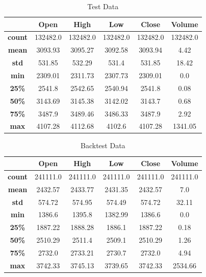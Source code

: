 \begin{table}[H]
    \centering
    \begin{tabular}{cccccc}
        \toprule
        & Open & High & Low & Close & Volume
        \\
        \midrule
        \textbf{count} & 132482.0 & 132482.0 & 132482.0 & 132482.0 & 132482.0 \\
        \textbf{mean}  & 3093.93  & 3095.27  & 3092.58  & 3093.94  & 4.42     \\
        \textbf{std}   & 531.85   & 532.29   & 531.4    & 531.85   & 18.42    \\
        \textbf{min}   & 2309.01  & 2311.73  & 2307.73  & 2309.01  & 0.0      \\
        \textbf{25\%}  & 2541.8   & 2542.65  & 2540.94  & 2541.8   & 0.08     \\
        \textbf{50\%}  & 3143.69  & 3145.38  & 3142.02  & 3143.7   & 0.68     \\
        \textbf{75\%}  & 3487.9   & 3489.46  & 3486.33  & 3487.9   & 2.92     \\
        \textbf{max}   & 4107.28  & 4112.68  & 4102.6   & 4107.28  & 1341.05  \\
        \bottomrule
    \end{tabular}
    \caption{Test Data}
    \label{tbl:test-data}
\end{table}

\begin{table}[H]
    \centering
    \begin{tabular}{cccccc}
        \toprule
        & Open & High & Low & Close & Volume
        \\
        \midrule
        \textbf{count} & 241111.0 & 241111.0 & 241111.0 & 241111.0 & 241111.0 \\
        \textbf{mean}  & 2432.57  & 2433.77  & 2431.35  & 2432.57  & 7.0      \\
        \textbf{std}   & 574.72   & 574.95   & 574.49   & 574.72   & 32.11    \\
        \textbf{min}   & 1386.6   & 1395.8   & 1382.99  & 1386.6   & 0.0      \\
        \textbf{25\%}  & 1887.22  & 1888.28  & 1886.1   & 1887.22  & 0.18     \\
        \textbf{50\%}  & 2510.29  & 2511.4   & 2509.1   & 2510.29  & 1.26     \\
        \textbf{75\%}  & 2732.0   & 2733.21  & 2730.7   & 2732.0   & 4.94     \\
        \textbf{max}   & 3742.33  & 3745.13  & 3739.65  & 3742.33  & 2534.66  \\
        \bottomrule
    \end{tabular}
    \caption{Backtest Data}
    \label{tbl:backtest-data}
\end{table}

